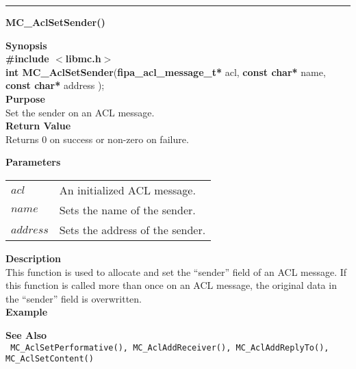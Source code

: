 \noindent
\vspace{5pt}
\rule{6.5in}{0.015in}
\noindent
{}
{\LARGE \bf MC\_AclSetSender()}\\
\label{api:MC_Acl_SetSender()}

\noindent
{\bf Synopsis}\\
{\bf \#include $<$libmc.h$>$}\\
{\bf int MC\_AclSetSender}({\bf fipa\_acl\_message\_t*} acl, {\bf const char*} name, {\bf const char*} address );\\

\noindent
{\bf Purpose}\\
Set the sender on an ACL message.\\

\noindent
{\bf Return Value}\\
Returns 0 on success or non-zero on failure.

\noindent
{\bf Parameters}
\vspace{-0.1in}
\begin{description}
\item
\begin{tabular}{p{10 mm}p{145 mm}} 
$acl$ & An initialized ACL message. \\
$name$ & Sets the name of the sender. \\
$address$ & Sets the address of the sender. 
\end{tabular}
\end{description}

\noindent
{\bf Description}\\
This function is used to allocate and set the ``sender'' field of
an ACL message. If this function is called more than once on an ACL 
message, the original data in the ``sender'' field is overwritten.\\

\noindent
{\bf Example}\\
\noindent
{\footnotesize}

\noindent
{\bf See Also}\\
\texttt{
  MC\_AclSetPerformative(), MC\_AclAddReceiver(), MC\_AclAddReplyTo(), 
    \linebreak MC\_AclSetContent()
}

